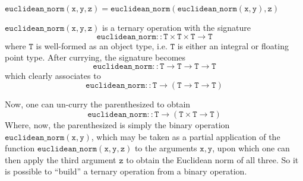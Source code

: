 \begin{Lemma}
    $\mathtt{euclidean\_norm(x, y, z) = euclidean\_norm(euclidean\_norm(x, y), z)}$
\end{Lemma}

\begin{solution}
    $\mathtt{euclidean\_norm(x, y, z)}$ is a ternary operation with the signature
    $$\mathtt{euclidean\_norm :: T \times T \times T \rightarrow T}$$
    where $\mathtt{T}$ is well-formed as an object type, i.e. $\mathtt{T}$ is either an integral or floating
    point type. After currying, the signature becomes
    $$\mathtt{euclidean\_norm :: T \rightarrow T \rightarrow T \rightarrow T}$$
    which clearly associates to
    $$\mathtt{euclidean\_norm :: T \rightarrow \left(T \rightarrow T \rightarrow T\right)}$$

    Now, one can un-curry the parenthesized to obtain
    $$\mathtt{euclidean\_norm :: T \rightarrow \left(T \times T \rightarrow T\right)}$$
    Where, now, the parenthesized is simply the binary operation $\mathtt{euclidean\_norm(x, y)}$, which may
    be taken as a partial application of the function $\mathtt{euclidean\_norm(x,y,z)}$ to the arguments
    $\mathtt{x, y}$, upon which one can then apply the third argument $\mathtt{z}$ to obtain the Euclidean norm
    of all three. So it is possible to \enquote{build} a ternary operation from a binary operation.
\end{solution}
